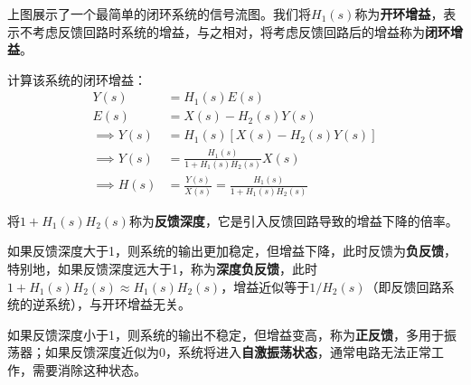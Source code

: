 上图展示了一个最简单的闭环系统的信号流图。我们将$H_1(s)$称为\textbf{开环增益}，表示不考虑反馈回路时系统的增益，与之相对，将考虑反馈回路后的增益称为\textbf{闭环增益}。

计算该系统的闭环增益：
\begin{align*}
    Y(s)&=H_1(s)E(s)\\
    E(s)&=X(s)-H_2(s)Y(s)\\
    \implies Y(s)&=H_1(s)\left[X(s)-H_2(s)Y(s)\right]\\
    \implies Y(s)&=\frac{H_1(s)}{1+H_1(s)H_2(s)}X(s)\\
    \implies H(s)&=\frac{Y(s)}{X(s)}=\frac{H_1(s)}{1+H_1(s)H_2(s)}
\end{align*}

\begin{definition}[反馈深度与反馈类型]
将$1+H_1(s)H_2(s)$称为\textbf{反馈深度}，它是引入反馈回路导致的增益下降的倍率。

如果反馈深度大于1，则系统的输出更加稳定，但增益下降，此时反馈为\textbf{负反馈}，特别地，如果反馈深度远大于1，称为\textbf{深度负反馈}，此时$1+H_1(s)H_2(s)\approx H_1(s)H_2(s)$，增益近似等于$1/H_2(s)$（即反馈回路系统的逆系统），与开环增益无关。

如果反馈深度小于1，则系统的输出不稳定，但增益变高，称为\textbf{正反馈}，多用于振荡器；如果反馈深度近似为0，系统将进入\textbf{自激振荡状态}，通常电路无法正常工作，需要消除这种状态。
\end{definition}

